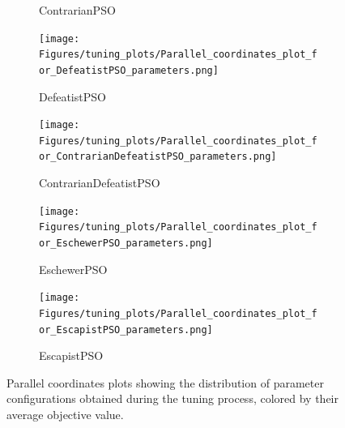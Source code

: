 \begin{figure}[H]
\begin{subfigure}{0.49\textwidth}
        \caption{ContrarianPSO}
    \end{subfigure}
        \begin{subfigure}{0.49\textwidth}
        \centering
        \texttt{[image: Figures/tuning\_plots/Parallel\_coordinates\_plot\_for\_DefeatistPSO\_parameters.png]}
        \caption{DefeatistPSO}
    \end{subfigure}
      \begin{subfigure}{0.49\textwidth}
        \centering
        \texttt{[image: Figures/tuning\_plots/Parallel\_coordinates\_plot\_for\_ContrarianDefeatistPSO\_parameters.png]}
        \caption{ContrarianDefeatistPSO}
    \end{subfigure}
        \begin{subfigure}{0.49\textwidth}
        \centering
        \texttt{[image: Figures/tuning\_plots/Parallel\_coordinates\_plot\_for\_EschewerPSO\_parameters.png]}
        \caption{EschewerPSO}
    \end{subfigure}
    \begin{subfigure}{0.49\textwidth}
        \centering
        \texttt{[image: Figures/tuning\_plots/Parallel\_coordinates\_plot\_for\_EscapistPSO\_parameters.png]}
        \caption{EscapistPSO}
    \end{subfigure}
            \captionsetup{list=no}
\caption[Parallel coordinates plots of parameter configurations]{Parallel coordinates plots showing the distribution of parameter configurations obtained during the tuning process, colored by their average objective value.}
\end{figure}


